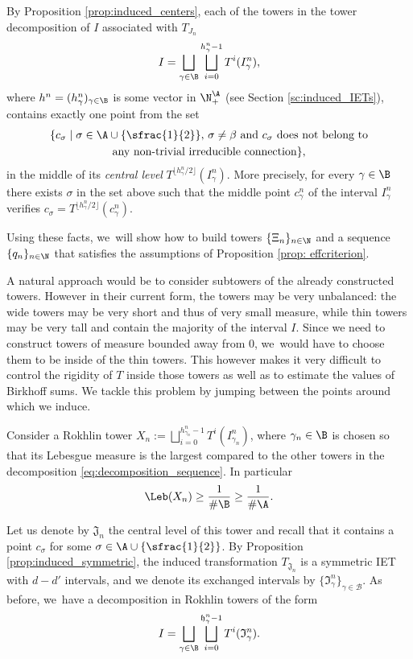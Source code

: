 By Proposition \ref{prop:induced_centers}, each of the towers in the tower decomposition of $I$ associated with $T_{J_n}$
\begin{equation}
\label{eq:decomposition_sequence}
I = \bigsqcup_{\gamma \in \B} \bigsqcup_{i = 0}^{h_\gamma^n - 1} T^i(I_\gamma^n),
\end{equation}
where $h^n = (h^n_\gamma)_{\gamma \in \B}$ is some vector in $\N^\A_+$ (see Section \ref{sc:induced_IETs}), contains exactly one point from the set
\begin{multline*}
 \{c _\sigma \mid \sigma \in \A \cup \{\sfrac{1}{2}\},\, \sigma \neq \beta \text{ and } c_\sigma \text{ does not belong to}\\
\text{any non-trivial irreducible connection}\},
\end{multline*}
in the middle of its \emph{central level} $T^{\lfloor h_\gamma^n/2
\rfloor}(I^n_\gamma)$. More precisely, for every $\gamma \in \B$ there exists
$\sigma$ in the set above such that the middle point $c_\gamma^n$ of the
interval $I_\gamma^n$ verifies $c_\sigma = T^{\lfloor h_\gamma^n/2
\rfloor}(c_\gamma^n)$.

Using these facts, we~will show how to build towers $\{\Xi_n\}_{n\in\N}$ and a sequence $\{q_n\}_{n\in\N}$ that satisfies the assumptions of Proposition \ref{prop: effcriterion}.

A natural approach would be to consider subtowers of the already constructed towers. However in their current form, the towers may be very unbalanced: the wide towers may be very short and thus of very small measure, while thin towers may be very tall and contain the majority of the interval $I$. Since we need to construct towers of measure bounded away from 0, we~would have to choose them to be inside of the thin towers. This however makes it very difficult to control the rigidity of $T$ inside those towers as well as to estimate the values of Birkhoff sums. We tackle this problem by jumping between the points around which we induce.

Consider a Rokhlin tower $X_n:=\bigsqcup_{i=0}^{h_{\gamma_n}^n-1}T^i(I^n_{\gamma_n})$, where $\gamma_n \in\mathcal \B$ is chosen so that its Lebesgue measure is the largest compared to the other towers in the decomposition \eqref{eq:decomposition_sequence}. In particular
\[
\Leb(X_n)\geq \frac{1}{\#\B}\ge\frac{1}{\#\A}.
\]

Let us denote by $\mathfrak J_n$ the central level of this tower and recall that it contains a point $c_\sigma$ for some $\sigma \in \A \cup \{\sfrac{1}{2}\}$. By Proposition \ref{prop:induced_symmetric}, the induced transformation $T_{\mathfrak J_n}$ is a symmetric IET with $d - d'$ intervals, and we denote its exchanged intervals by $\{\mathfrak I_{\gamma}^n\}_{\gamma \in \mathcal B}$. As before, we~have a decomposition in Rokhlin towers of the form
\[
 I = \bigsqcup_{\gamma \in \B} \bigsqcup_{i = 0}^{\mathfrak h_\gamma^n - 1} T^i(\mathfrak I_\gamma^n).
\]


